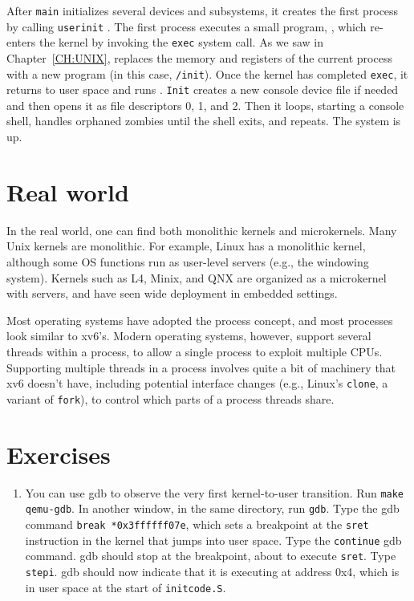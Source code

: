 After
\lstinline{main}
initializes several devices and subsystems, 
it creates the first process by calling 
\lstinline{userinit}
.
The first process executes a small program,
,
which re-enters the kernel by invoking the
\lstinline{exec}
system call.
As we saw in Chapter~\ref{CH:UNIX}, 
replaces the memory and registers of the
current process with a new program (in this case,
\lstinline{/init}).
Once the kernel has completed 
\lstinline{exec},
it returns to user space and runs
.
\lstinline{Init}
creates a new console device file
if needed
and then opens it as file descriptors 0, 1, and 2.
Then it loops,
starting a console shell, 
handles orphaned zombies until the shell exits,
and repeats.
The system is up.
\section{Real world}

In the real world, one can find both monolithic kernels and microkernels. Many
Unix kernels are monolithic. For example, Linux has a monolithic kernel,
although some OS functions run as user-level servers (e.g., the windowing
system).  Kernels such as L4, Minix, and QNX are organized as a microkernel with
servers, and have seen wide deployment in embedded settings.

Most operating systems have adopted the process concept, and most
processes look similar to xv6's.  Modern operating systems, however,
support several threads within a process, to allow a single process to
exploit multiple CPUs.  Supporting multiple threads in a
process involves quite a bit of machinery that xv6 doesn't have,
including potential interface changes (e.g., Linux's
\lstinline{clone},
a variant of
\lstinline{fork}),
to control which parts of
a process threads share.
\section{Exercises}

\begin{enumerate}

\item You can use gdb to observe the very first kernel-to-user
transition. Run {\tt make qemu-gdb}.
In another window, in the same directory, run {\tt gdb}.
Type the gdb command {\tt break *0x3ffffff07e}, which sets
a breakpoint at the {\tt sret} instruction in the kernel
that jumps into user space. Type the {\tt continue} gdb command.
gdb should stop at the breakpoint, about to
execute {\tt sret}. Type {\tt stepi}. gdb should now
indicate that it is executing at address 0x4, which is
in user space at the start of {\tt initcode.S}.


\end{enumerate}
